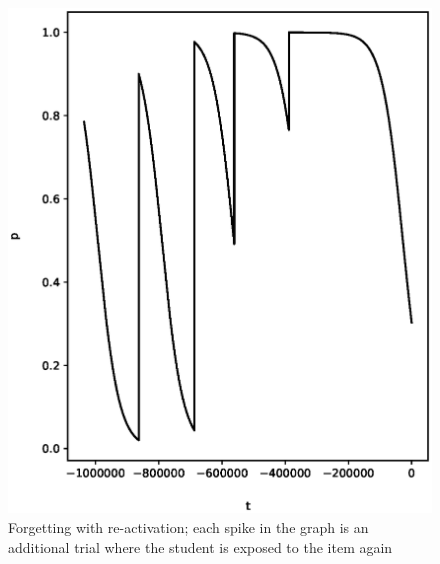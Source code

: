 \begin{figure}[p!]
 \label{fig:memory}
 \includegraphics{fig/memory.eps} 
 \caption{Forgetting with re-activation; each spike in the graph is an
 additional trial where the student is exposed to the item again}
\end{figure}

